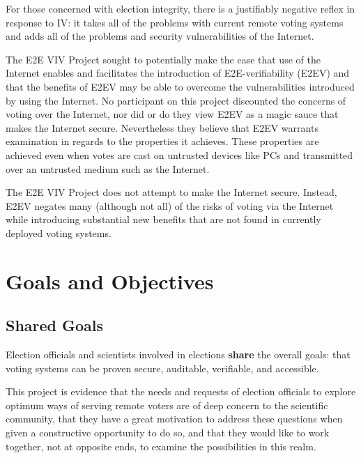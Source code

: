 For those concerned with election integrity, there is a justifiably
negative reflex in response to IV: it takes all of the problems with
current remote voting systems and adds all of the problems and
security vulnerabilities of the Internet.  

The E2E VIV Project sought to potentially make the case that use of
the Internet enables and facilitates the introduction of
E2E-verifiability (E2EV) and that the benefits of E2EV may be able to
overcome the vulnerabilities introduced by using the Internet. No
participant on this project discounted the concerns of voting over the
Internet, nor did or do they view E2EV as a magic sauce that makes the
Internet secure. Nevertheless they believe that E2EV warrants
examination in regards to the properties it achieves. These properties
are achieved even when votes are cast on untrusted devices like PCs
and transmitted over an untrusted medium such as the Internet.

The E2E VIV Project does not attempt to make the Internet
secure. Instead, E2EV negates many (although not all) of the risks of
voting via the Internet while introducing substantial new benefits
that are not found in currently deployed voting systems.

\section{Goals and Objectives}
\label{sec:goals-objectives}

\subsection{Shared Goals}
\label{sec:shared-goals}

Election officials and scientists involved in elections \textbf{share}
the overall goals: that voting systems can be proven secure,
auditable, verifiable, and accessible.

This project is evidence that the needs and requests of election
officials to explore optimum ways of serving remote voters are of deep
concern to the scientific community, that they have a great motivation
to address these questions when given a constructive opportunity to do
so, and that they would like to work together, not at opposite ends,
to examine the possibilities in this realm.

